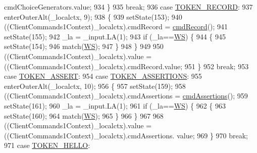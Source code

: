 \begin{DoxyCode}
      cmdChoiceGenerators.value; 
934         \}
935         \textcolor{keywordflow}{break};
936       \textcolor{keywordflow}{case} \hyperlink{classgov_1_1nasa_1_1jpf_1_1inspector_1_1client_1_1parser_1_1_console_grammar_parser_a344f8da5c5fff173cb90ded13f52017f}{TOKEN\_RECORD}:
937         enterOuterAlt(\_localctx, 9);
938         \{
939         setState(153);
940         ((ClientCommands1Context)\_localctx).cmdRecord = \hyperlink{classgov_1_1nasa_1_1jpf_1_1inspector_1_1client_1_1parser_1_1_console_grammar_parser_a9e1ec461862baeda7056c017c959cd7d}{cmdRecord}();
941         setState(155);
942         \_la = \_input.LA(1);
943         \textcolor{keywordflow}{if} (\_la==\hyperlink{classgov_1_1nasa_1_1jpf_1_1inspector_1_1client_1_1parser_1_1_console_grammar_parser_a6914a3a3adbc350b12a7df9d1b24abf1}{WS}) \{
944           \{
945           setState(154);
946           match(\hyperlink{classgov_1_1nasa_1_1jpf_1_1inspector_1_1client_1_1parser_1_1_console_grammar_parser_a6914a3a3adbc350b12a7df9d1b24abf1}{WS});
947           \}
948         \}
949 
950          ((ClientCommands1Context)\_localctx).value =  ((ClientCommands1Context)\_localctx).cmdRecord.value; 
951         \}
952         \textcolor{keywordflow}{break};
953       \textcolor{keywordflow}{case} \hyperlink{classgov_1_1nasa_1_1jpf_1_1inspector_1_1client_1_1parser_1_1_console_grammar_parser_a53439b8a59a0be879a077ffb8bb59107}{TOKEN\_ASSERT}:
954       \textcolor{keywordflow}{case} \hyperlink{classgov_1_1nasa_1_1jpf_1_1inspector_1_1client_1_1parser_1_1_console_grammar_parser_a4a9f5da8ded8ec86d64dafbf8e21bb64}{TOKEN\_ASSERTIONS}:
955         enterOuterAlt(\_localctx, 10);
956         \{
957         setState(159);
958         ((ClientCommands1Context)\_localctx).cmdAssertions = \hyperlink{classgov_1_1nasa_1_1jpf_1_1inspector_1_1client_1_1parser_1_1_console_grammar_parser_aad29008053f0b40d17bf6e3e929b9b11}{cmdAssertions}();
959         setState(161);
960         \_la = \_input.LA(1);
961         \textcolor{keywordflow}{if} (\_la==\hyperlink{classgov_1_1nasa_1_1jpf_1_1inspector_1_1client_1_1parser_1_1_console_grammar_parser_a6914a3a3adbc350b12a7df9d1b24abf1}{WS}) \{
962           \{
963           setState(160);
964           match(\hyperlink{classgov_1_1nasa_1_1jpf_1_1inspector_1_1client_1_1parser_1_1_console_grammar_parser_a6914a3a3adbc350b12a7df9d1b24abf1}{WS});
965           \}
966         \}
967 
968          ((ClientCommands1Context)\_localctx).value =  ((ClientCommands1Context)\_localctx).cmdAssertions.
      value; 
969         \}
970         \textcolor{keywordflow}{break};
971       \textcolor{keywordflow}{case} \hyperlink{classgov_1_1nasa_1_1jpf_1_1inspector_1_1client_1_1parser_1_1_console_grammar_parser_a02654226879b17f8ee3fc4508bacb0e0}{TOKEN\_HELLO}:

\end{DoxyCode}
